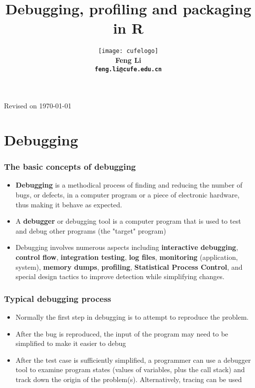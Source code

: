 \documentclass[10pt]{beamer}
\title[Statistical Computing]{{\textbf{Debugging, profiling and packaging in R}}}
\author[Feng Li]{\texttt{[image: cufelogo]}\\
  \vspace{0.5cm}\textbf{Feng Li\\\texttt{feng.li@cufe.edu.cn}}}
\institute[Stat \& Math, CUFE]{\footnotesize{\textbf{School of Statistics and
      Mathematics\\ Central University of Finance and Economics}}}
\begin{document}
\begin{frame}[plain]
  \titlepage
  \tiny{Revised on \today}
\end{frame}



\section{Debugging}

\begin{frame}
\frametitle{The basic concepts of debugging}

\begin{itemize}
\item \textbf{Debugging} is a methodical process of finding and reducing the number of bugs, or defects, in a computer program or a piece of electronic hardware, thus making it behave as expected.

\item A \textbf{debugger} or debugging tool is a computer program that
  is used to test and debug other programs (the "target" program)

\item Debugging involves numerous aspects including \textbf{interactive debugging}, \textbf{control flow}, \textbf{integration testing}, \textbf{log files}, \textbf{monitoring} (application, system), \textbf{memory dumps}, \textbf{profiling}, \textbf{Statistical Process Control}, and special design tactics to improve detection while simplifying changes.


\end{itemize}

\end{frame}

\begin{frame}
  \frametitle{Typical debugging process}

  \begin{itemize}
  \item Normally the first step in debugging is to attempt to
    reproduce the problem.

  \item After the bug is reproduced, the input of the program may need
    to be simplified to make it easier to debug

  \item After the test case is sufficiently simplified, a programmer
    can use a debugger tool to examine program states (values of
    variables, plus the call stack) and track down the origin of the
    problem(s). Alternatively, tracing can be used

  \end{itemize}
\end{frame}
\end{document}
